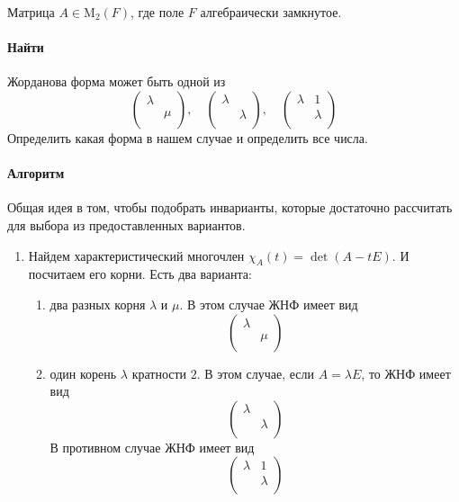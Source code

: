 \documentclass{article}
\newcommand{\Matrix}[2]{\operatorname{\mathrm{M}_{#2}}(#1)}
\begin{document}
Матрица $A\in \Matrix{F}{2}$, где поле $F$ алгебраически замкнутое.

\paragraph{Найти}

Жорданова форма может быть одной из
\[
\begin{pmatrix}
{\lambda}&{}\\
{}&{\mu}\\
\end{pmatrix}
,\quad
\begin{pmatrix}
{\lambda}&{}\\
{}&{\lambda}\\
\end{pmatrix}
,\quad
\begin{pmatrix}
{\lambda}&{1}\\
{}&{\lambda}\\
\end{pmatrix}
\]
Определить какая форма в нашем случае и определить все числа.

\paragraph{Алгоритм}

Общая идея в том, чтобы подобрать инварианты, которые достаточно рассчитать для выбора из предоставленных вариантов.
\begin{enumerate}
\item Найдем характеристический многочлен $\chi_A(t) =\det(A - t E)$.
И посчитаем его корни.
Есть два варианта: 
\begin{enumerate}
\item два разных корня $\lambda$ и $\mu$.
В этом случае ЖНФ имеет вид
\[
\begin{pmatrix}
{\lambda}&{}\\
{}&{\mu}\\
\end{pmatrix}
\]

\item один корень $\lambda$ кратности $2$.
В этом случае, если $A = \lambda E$, то ЖНФ имеет вид
\[
\begin{pmatrix}
{\lambda}&{}\\
{}&{\lambda}\\
\end{pmatrix}
\]
В противном случае ЖНФ имеет вид
\[
\begin{pmatrix}
{\lambda}&{1}\\
{}&{\lambda}\\
\end{pmatrix}
\]
\end{enumerate}
\end{enumerate}
\end{document}
